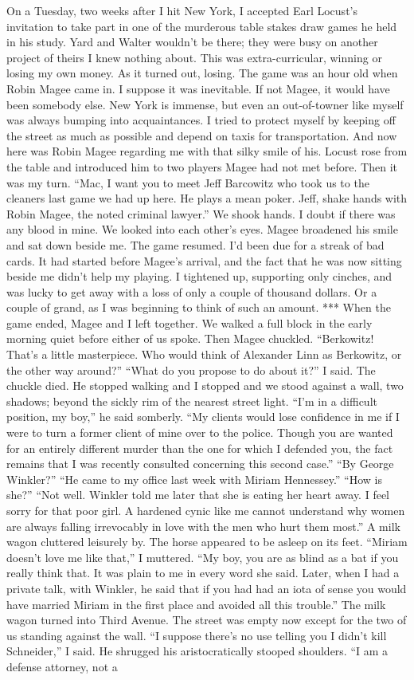 \documentclass{novel}
\begin{document}
On a Tuesday, two weeks after I hit New York, I accepted Earl Locust’s invitation to take part in one of the murderous table stakes draw games he held in his study. Yard and Walter wouldn’t be there; they were busy on another project of theirs I knew nothing about. This was extra-curricular, winning or losing my own money. As it turned out, losing. The game was an hour old when Robin Magee came in. I suppose it was inevitable. If not Magee, it would have been somebody else. New York is immense, but even an out-of-towner like myself was always bumping into acquaintances. I tried to protect myself by keeping off the street as much as possible and depend on taxis for transportation. And now here was Robin Magee regarding me with that silky smile of his. Locust rose from the table and introduced him to two players Magee had not met before. Then it was my turn. “Mac, I want you to meet Jeff Barcowitz who took us to the cleaners last game we had up here. He plays a mean poker. Jeff, shake hands with Robin Magee, the noted criminal lawyer.” We shook hands. I doubt if there was any blood in mine. We looked into each other’s eyes. Magee broadened his smile and sat down beside me. The game resumed. I’d been due for a streak of bad cards. It had started before Magee’s arrival, and the fact that he was now sitting beside me didn’t help my playing. I tightened up, supporting only cinches, and was lucky to get away with a loss of only a couple of thousand dollars. Or a couple of grand, as I was beginning to think of such an amount. *** When the game ended, Magee and I left together. We walked a full block in the early morning quiet before either of us spoke. Then Magee chuckled. “Berkowitz! That’s a little masterpiece. Who would think of Alexander Linn as Berkowitz, or the other way around?” “What do you propose to do about it?” I said. The chuckle died. He stopped walking and I stopped and we stood against a wall, two shadows; beyond the sickly rim of the nearest street light. “I’m in a difficult position, my boy,” he said somberly. “My clients would lose confidence in me if I were to turn a former client of mine over to the police. Though you are wanted for an entirely different murder than the one for which I defended you, the fact remains that I was recently consulted concerning this second case.” “By George Winkler?” “He came to my office last week with Miriam Hennessey.” “How is she?” “Not well. Winkler told me later that she is eating her heart away. I feel sorry for that poor girl. A hardened cynic like me cannot understand why women are always falling irrevocably in love with the men who hurt them most.” A milk wagon cluttered leisurely by. The horse appeared to be asleep on its feet. “Miriam doesn’t love me like that,” I muttered. “My boy, you are as blind as a bat if you really think that. It was plain to me in every word she said. Later, when I had a private talk, with Winkler, he said that if you had had an iota of sense you would have married Miriam in the first place and avoided all this trouble.” The milk wagon turned into Third Avenue. The street was empty now except for the two of us standing against the wall. “I suppose there’s no use telling you I didn’t kill Schneider,” I said. He shrugged his aristocratically stooped shoulders. “I am a defense attorney, not a 
\end{document}
